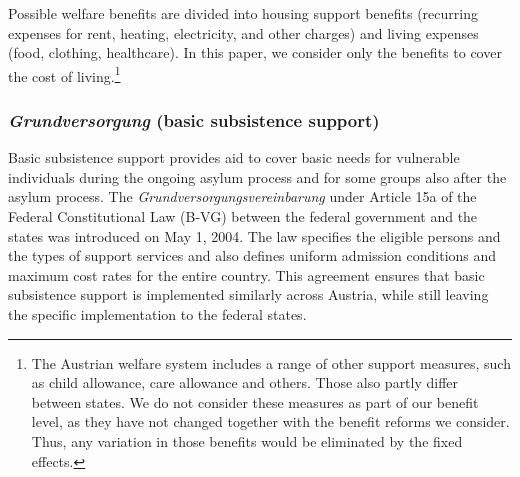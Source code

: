 
Possible welfare benefits are divided into housing support benefits (recurring expenses for rent, heating, electricity, and other charges) and living expenses (food, clothing, healthcare). In this paper, we consider only the benefits to cover the cost of living.\footnote{The Austrian welfare system includes a range of other support measures, such as child allowance, care allowance and others. Those also partly differ between states. We do not consider these measures as part of our benefit level, as they have not changed together with the benefit reforms we consider. Thus, any variation in those benefits would be eliminated by the fixed effects.}



\subsubsection*{\textit{Grundversorgung} (basic subsistence support)}
Basic subsistence support provides aid to cover basic needs for vulnerable individuals during the ongoing asylum process and for some groups also after the asylum process. %
The \textit{Grundversorgungsvereinbarung} under Article 15a of the Federal Constitutional Law (B-VG) between the federal government and the states was introduced on May 1, 2004. The law specifies the eligible persons and the types of support services and also defines uniform admission conditions and maximum cost rates for the entire country. This agreement ensures that basic subsistence support is implemented similarly across Austria, while still leaving the specific implementation to the federal states.

